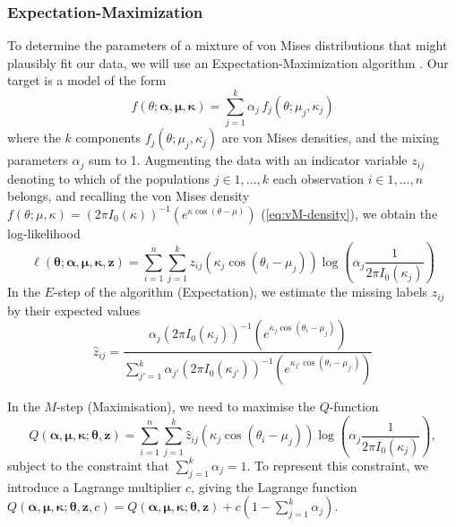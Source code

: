 \documentclass[../../ArchStats.tex]{subfiles}
\begin{document}

\subsubsection{Expectation-Maximization}

To determine the parameters of a mixture of von Mises distributions that might plausibly fit our data, we will use an Expectation-Maximization algorithm \cite{Chang-Chien2012}. Our target is a model of the form
\begin{equation}
f(\theta; \boldsymbol{\alpha, \mu, \kappa}) = \sum_{j=1}^k \alpha_j \, f_j(\theta; \mu_j, \kappa_j)
\end{equation}
where the $k$ components $f_j(\theta; \mu_j, \kappa_j)$  are von Mises densities, and the mixing parameters $\alpha_j$ sum to 1. Augmenting the data with an indicator variable $z_{ij}$ denoting to which of the populations $j \in {1, \dots, k}$ each observation $i \in {1, \dots, n}$ belongs, and recalling the von Mises density $f(\theta; \mu, \kappa) = (2\pi I_0(\kappa))^{-1}(e^{\kappa \cos(\theta - \mu)})$ (\ref{eq:vM-density}), we obtain the log-likelihood
\begin{equation}
\ell(\boldsymbol{\theta}; \boldsymbol{\alpha, \mu, \kappa, z}) = \sum_{i=1}^n \sum_{j=1}
^k z_{ij} \left(\kappa_j \cos(\theta_i - \mu_j)  \right) \log \left( \alpha_j  \frac{1}{2\pi I_0(\kappa_j)} \right)
\end{equation}
In the $E$-step  of the algorithm (Expectation), we estimate the missing labels $z_{ij}$ by their expected values
\begin{equation}
\label{eq:EM-z}
\hat{z}_{ij} = \frac{\alpha_j (2\pi I_0(\kappa_j))^{-1}(e^{\kappa_j \cos(\theta_i - \mu_j)})}{\sum_{j'=1}^k \alpha_{j'} (2\pi I_0(\kappa_{j'}))^{-1}(e^{\kappa_{j'} \cos(\theta_i - \mu_{j'})})} 
\end{equation}

In the $M$-step (Maximisation), we need to maximise the $Q$-function
\begin{equation}
Q(\boldsymbol{\alpha, \mu, \kappa}; \boldsymbol{\theta, z}) = \sum_{i=1}^n \sum_{j=1}
^k \hat{z}_{ij} \left(\kappa_j \cos(\theta_i - \mu_j)  \right) \log \left( \alpha_j  \frac{1}{2\pi I_0(\kappa_j)} \right),
\end{equation}
subject to the constraint that $\sum_{j=1}^k \alpha_j = 1$. To represent this constraint, we introduce a Lagrange multiplier $c$, giving the Lagrange function $Q(\boldsymbol{\alpha, \mu, \kappa}; \boldsymbol{\theta, z}, c) = Q(\boldsymbol{\alpha, \mu, \kappa}; \boldsymbol{\theta, z}) + c \left(1 - \sum_{j=1}^k \alpha_j \right)$. 
\end{document}
